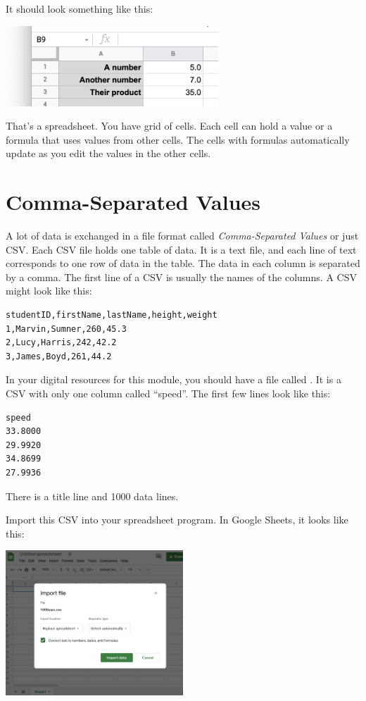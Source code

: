 It should look something like this:

\includegraphics[width=0.6\textwidth]{FirstFormatting.png}

That's a spreadsheet. You have grid of cells. Each cell can hold a
value or a formula that uses values from other cells. The cells with
formulas automatically update as you edit the values in the other
cells.

\section{Comma-Separated Values}

A lot of data is exchanged in a file format called
\textit{Comma-Separated Values} or just CSV. Each CSV file holds one
table of data. It is a text file, and each line of text corresponds to
one row of data in the table. The data in each column is separated by
a comma. The first line of a CSV is usually the names of the
columns. A CSV might look like this:

\begin{Verbatim}
studentID,firstName,lastName,height,weight
1,Marvin,Sumner,260,45.3
2,Lucy,Harris,242,42.2
3,James,Boyd,261,44.2
\end{Verbatim}

In your digital resources for this module, you should have a file
called . It is a CSV with only one column called
``speed''. The first few lines look like this:

\begin{Verbatim}
speed
33.8000
29.9920
34.8699
27.9936
\end{Verbatim}

There is a title line and 1000 data lines.

Import this CSV into your spreadsheet program. In Google Sheets, it looks like this:

\includegraphics[width=0.5\textwidth]{ImportingCSV.png}

